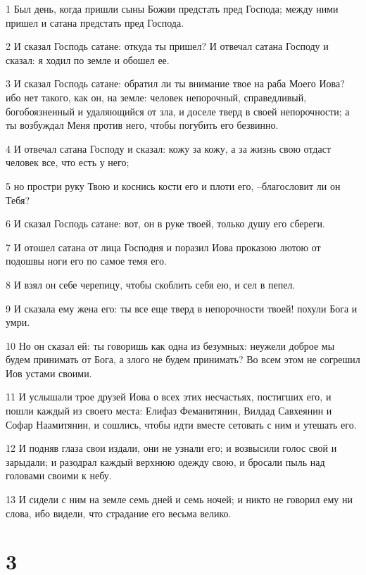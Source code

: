 \par 1 Был день, когда пришли сыны Божии предстать пред Господа; между ними пришел и сатана предстать пред Господа.
\par 2 И сказал Господь сатане: откуда ты пришел? И отвечал сатана Господу и сказал: я ходил по земле и обошел ее.
\par 3 И сказал Господь сатане: обратил ли ты внимание твое на раба Моего Иова? ибо нет такого, как он, на земле: человек непорочный, справедливый, богобоязненный и удаляющийся от зла, и доселе тверд в своей непорочности; а ты возбуждал Меня против него, чтобы погубить его безвинно.
\par 4 И отвечал сатана Господу и сказал: кожу за кожу, а за жизнь свою отдаст человек все, что есть у него;
\par 5 но простри руку Твою и коснись кости его и плоти его, --благословит ли он Тебя?
\par 6 И сказал Господь сатане: вот, он в руке твоей, только душу его сбереги.
\par 7 И отошел сатана от лица Господня и поразил Иова проказою лютою от подошвы ноги его по самое темя его.
\par 8 И взял он себе черепицу, чтобы скоблить себя ею, и сел в пепел.
\par 9 И сказала ему жена его: ты все еще тверд в непорочности твоей! похули Бога и умри.
\par 10 Но он сказал ей: ты говоришь как одна из безумных: неужели доброе мы будем принимать от Бога, а злого не будем принимать? Во всем этом не согрешил Иов устами своими.
\par 11 И услышали трое друзей Иова о всех этих несчастьях, постигших его, и пошли каждый из своего места: Елифаз Феманитянин, Вилдад Савхеянин и Софар Наамитянин, и сошлись, чтобы идти вместе сетовать с ним и утешать его.
\par 12 И подняв глаза свои издали, они не узнали его; и возвысили голос свой и зарыдали; и разодрал каждый верхнюю одежду свою, и бросали пыль над головами своими к небу.
\par 13 И сидели с ним на земле семь дней и семь ночей; и никто не говорил ему ни слова, ибо видели, что страдание его весьма велико.

\chapter{3}

